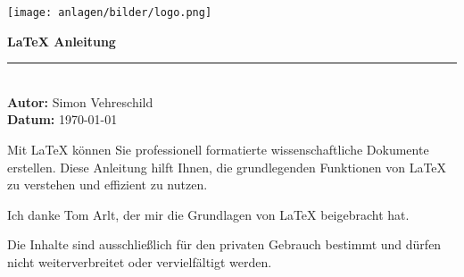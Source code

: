 \begin{titlepage}  %
    \begin{center}

        \vspace*{0.5cm}  %

        \texttt{[image: anlagen/bilder/logo.png]}
        \vspace{1cm}  %

        {\Huge \textbf{\LaTeX{} Anleitung}} \\[1.5cm]

        \rule{12cm}{0.5pt} \\[1.5cm]  %

        \textbf{\Large Autor:} {\Large Simon Vehreschild} \\[0.5cm]
        \textbf{\Large Datum:} {\Large \today} \\[3cm]

        \vfill

        {\Large Mit \LaTeX{} können Sie professionell formatierte wissenschaftliche Dokumente erstellen. Diese Anleitung hilft Ihnen, die grundlegenden Funktionen von \LaTeX{} zu verstehen und effizient zu nutzen.} \\[3cm]

        \vfill

        {\large Ich danke Tom Arlt, der mir die Grundlagen von \LaTeX{} beigebracht hat.}

        \vfill

        {\large Die Inhalte sind ausschließlich für den privaten Gebrauch bestimmt und dürfen nicht weiterverbreitet oder vervielfältigt werden.}

        \vfill  %
    \end{center}
\end{titlepage}